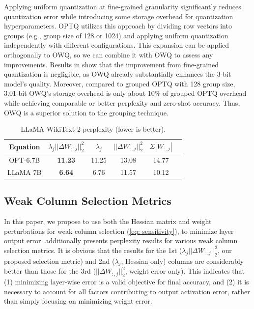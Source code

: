 \documentclass[letterpaper]{article} %
\begin{document}
Applying uniform quantization at fine-grained granularity significantly reduces quantization error while introducing some storage overhead for quantization hyperparameters. OPTQ utilizes this approach by dividing row vectors into groups (e.g., group size of 128 or 1024) and applying uniform quantization independently with different configurations. This expansion can be applied orthogonally to OWQ, so we can combine it with OWQ to assess any improvements. Results in  show that the improvement from fine-grained quantization is negligible, as OWQ already substantially enhances the 3-bit model's quality. Moreover, compared to grouped OPTQ with 128 group size, 3.01-bit OWQ's storage overhead is only about 10\% of grouped OPTQ overhead while achieving comparable or better perplexity and zero-shot accuracy. Thus, OWQ is a superior solution to the grouping technique.


\begin{table}[t]
        \centering
        \small
        \begin{tabular}{ c | c @{\hskip 0.12in} c @{\hskip 0.12in} c @{\hskip 0.12in} c @{\hskip 0.12in} c }
            \toprule
            Equation & $\lambda_j || \Delta W_{:,j} ||_2^2$ & $\lambda_{j}$ & $|| \Delta W_{:,j} ||_2^2$ & $\Sigma |W_{:,j}|$ \\
            \midrule
            OPT-6.7B & \textbf{11.23} & 11.25 & 13.08 & 14.77 \\
            LLaMA 7B & \textbf{6.64} & 6.76 & 11.57 & 10.12\\
            \bottomrule
        \end{tabular}
        \caption{LLaMA WikiText-2 perplexity (lower is better).}
        \label{table:weak_column_selection_metrics}
\end{table}

\subsection{Weak Column Selection Metrics}
In this paper, we propose to use both the Hessian matrix and weight perturbations for weak column selection (\cref{eq: sensitivity}), to minimize layer output error.  additionally presents perplexity results for various weak column selection metrics. It is obvious that the results for the 1st ($\lambda_j || \Delta W_{:,j} ||_2^2$, our proposed selection metric) and 2nd ($\lambda_{j}$, Hessian only) columns are considerably better than those for the 3rd ($|| \Delta W_{:,j} ||_2^2$, weight error only).
This indicates that (1) minimizing layer-wise error is a valid objective for final accuracy, and (2) it is necessary to account for all factors contributing to output activation error, rather than simply focusing on minimizing weight error.
\end{document}
